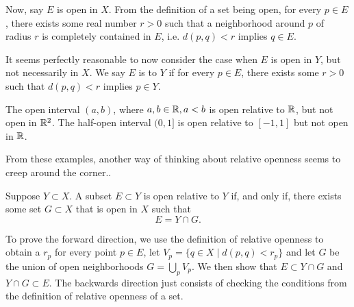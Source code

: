 \documentclass{article}
\begin{document}
Now, say $E$ is open in $X$. From the definition of a set being open, for every $p\in E$, there exists some real number $r>0$ such that a neighborhood around $p$ of radius $r$ is completely contained in $E$, i.e. $d(p,q)<r$ implies $q\in E$. 

It seems perfectly reasonable to now consider the case when $E$ is open in $Y$, but not necessarily in $X$. We say $E$ is  to $Y$ if for every $p\in E$, there exists some $r>0$ such that $d(p,q)<r$ implies $p\in Y$. 

\begin{example}
    \listhack 
    \begin{enumerate}
        \ii The open interval $(a,b)$, where $a,b\in\mathbb R, a<b$ is open relative to $\mathbb R$, but not open in $\mathbb R^{2}$.
        \ii The half-open interval $(0,1]$ is open relative to $[-1,1]$ but not open in $\mathbb R$.
    \end{enumerate}
\end{example}
From these examples, another way of thinking about relative openness seems to creep around the corner..
\begin{theorem}
    Suppose $Y\subset X$. A subset $E\subset Y$ is open relative to $Y$ if, and only if, there exists some set $G\subset X$ that is open in $X$ such that \[E=Y\cap G.\]
\end{theorem}
\begin{remark}
    To prove the forward direction, we use the definition of relative openness to obtain a $r_{p}$ for every point $p\in E$, let $V_{p}=\{q\in X\mid d(p,q)<r_{p}\}$ and let $G$ be the union of open neighborhoods $G=\bigcup_{p}V_{p}$. We then show that $E\subset Y\cap G$ and $Y\cap G \subset E$. The backwards direction just consists of checking the conditions from the definition of relative openness of a set.
\end{remark}
\end{document}
